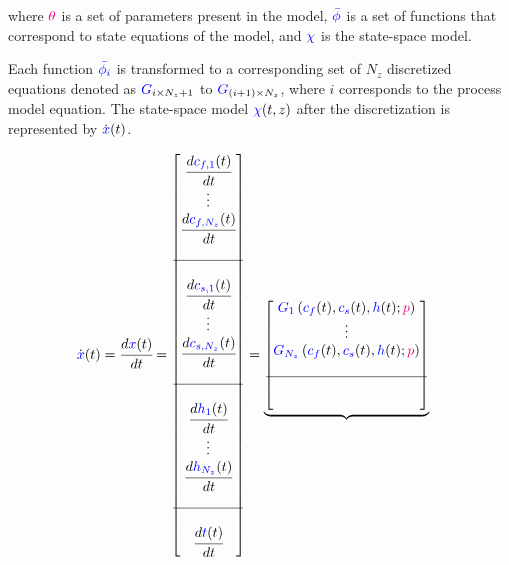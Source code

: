 \documentclass[../Article_Model_Parameters.tex]{subfiles}
\begin{document}
		where ${\color{magenta}\theta}$ is a set of parameters present in the model, ${\color{blue}\bar{\phi}}$ is a set of functions that correspond to state equations of the model, and ${\color{blue}\chi}$ is the state-space model.
		
		Each function ${\color{blue}\bar{\phi_i}}$ is transformed to a corresponding set of $N_z$ discretized equations denoted as ${\color{blue}G}_{i\times N_z+1}$ to ${\color{blue}G}_{(i+1)\times N_z}$, where $i$ corresponds to the process model equation. The state-space model ${\color{blue}\chi}(t,z)$ after the discretization is represented by $\dot{{\color{blue}x}}(t)$.
			
			{\footnotesize
				\begin{align*} \label{discretization}
					\dot{{\color{blue}x}}(t) &= \cfrac{d {\color{blue}x}(t)}{d t} = 
					\begin{bmatrix}
						\cfrac{d {\color{blue}c_{f,1}}(t)}{d t} 	  \\
						\vdots					  \\
						\cfrac{d {\color{blue}c_{f,N_z}}(t)}{d t} \\
						\\ \hline \\
						\cfrac{d {\color{blue}c_{s,1}}(t)}{d t} 	  \\
						\vdots					  \\
						\cfrac{d {\color{blue}c_{s,N_z}}(t)}{d t} \\
						\\ \hline \\
						\cfrac{d {\color{blue}h_1}(t)}{d t} 	  \\
						\vdots 					  \\
						\cfrac{d {\color{blue}h_{N_z}}(t)}{d t} \\
						\\ \hline \\
						\cfrac{d {\color{blue}t}(t)}{d t}
					\end{bmatrix}
					=
					\underbrace{\begin{bmatrix}
							{\color{blue}G_1} \left( {\color{blue}c_f}(t),{\color{blue}c_s}(t),{\color{blue}h}(t); {\color{magenta}p} \right)\\ 
							\vdots\\ 
							{\color{blue}G_{N_z}} \left( {\color{blue}c_f}(t),{\color{blue}c_s}(t),{\color{blue}h}(t); {\color{magenta}p} \right)\\ 
							\\ \hline \\ \\

\end{bmatrix}}
\end{align*}}
\end{document}
